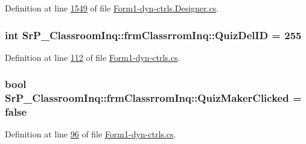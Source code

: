 \-Definition at line \hyperlink{_form1-dyn-ctrls_8_designer_8cs_source_l01549}{1549} of file \hyperlink{_form1-dyn-ctrls_8_designer_8cs_source}{\-Form1-\/dyn-\/ctrls.\-Designer.\-cs}.

\hypertarget{class_sr_p___classroom_inq_1_1frm_classrrom_inq_a2221a860fdb3bc2837b3ca3c0cee182c}{
\subsubsection[{\-Quiz\-Del\-I\-D}]{\setlength{\rightskip}{0pt plus 5cm}int {\bf \-Sr\-P\-\_\-\-Classroom\-Inq\-::frm\-Classrrom\-Inq\-::\-Quiz\-Del\-I\-D} = 255}}
\label{class_sr_p___classroom_inq_1_1frm_classrrom_inq_a2221a860fdb3bc2837b3ca3c0cee182c}


\-Definition at line \hyperlink{_form1-dyn-ctrls_8cs_source_l00112}{112} of file \hyperlink{_form1-dyn-ctrls_8cs_source}{\-Form1-\/dyn-\/ctrls.\-cs}.

\hypertarget{class_sr_p___classroom_inq_1_1frm_classrrom_inq_a80b43512315939f073e08cfea00ce796}{
\subsubsection[{\-Quiz\-Maker\-Clicked}]{\setlength{\rightskip}{0pt plus 5cm}bool {\bf \-Sr\-P\-\_\-\-Classroom\-Inq\-::frm\-Classrrom\-Inq\-::\-Quiz\-Maker\-Clicked} = false}}
\label{class_sr_p___classroom_inq_1_1frm_classrrom_inq_a80b43512315939f073e08cfea00ce796}


\-Definition at line \hyperlink{_form1-dyn-ctrls_8cs_source_l00096}{96} of file \hyperlink{_form1-dyn-ctrls_8cs_source}{\-Form1-\/dyn-\/ctrls.\-cs}.

